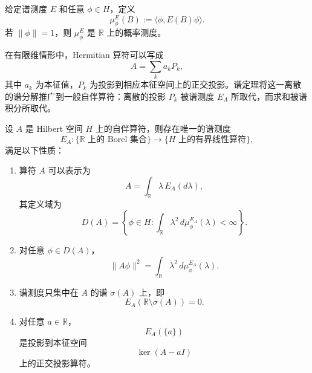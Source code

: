 \documentclass[UTF8,a4paper,11pt,openany]{ctexbook}
\begin{document}
给定谱测度 $E$ 和任意 $\phi\in H$，定义
\begin{equation}
    \mu_\phi^E(B)
    :=
    \langle \phi,E(B)\phi\rangle .
\end{equation}
若 $\|\phi\|=1$，则 $\mu_\phi^E$ 是 $\mathbb R$ 上的概率测度。

在有限维情形中，Hermitian 算符可以写成
\[
A=\sum_k a_kP_k,
\]
其中 $a_k$ 为本征值，$P_k$ 为投影到相应本征空间上的正交投影。谱定理将这一离散的谱分解推广到一般自伴算符：离散的投影 $P_k$ 被谱测度 $E_A$ 所取代，而求和被谱积分所取代。

\begin{proposition}[谱定理]
设 $A$ 是 Hilbert 空间 $H$ 上的自伴算符，则存在唯一的谱测度
\[
E_A:
\{\mathbb R\text{ 上的 Borel 集合}\}
\longrightarrow
\{H\text{ 上的有界线性算符}\},
\]
满足以下性质：

\begin{enumerate}
    \item 算符 $A$ 可以表示为
    \begin{equation}
        A
        =
        \int_{\mathbb R}
        \lambda\,E_A(d\lambda),
    \end{equation}
    其定义域为
    \begin{equation}
        D(A)
        =
        \left\{
        \phi\in H:
        \int_{\mathbb R}
        \lambda^2\,d\mu_\phi^{E_A}(\lambda)
        <\infty
        \right\}.
    \end{equation}

    \item 对任意 $\phi\in D(A)$，
    \begin{equation}
        \|A\phi\|^2
        =
        \int_{\mathbb R}
        \lambda^2\,d\mu_\phi^{E_A}(\lambda).
    \end{equation}

    \item 谱测度只集中在 $A$ 的谱 $\sigma(A)$ 上，即
    \begin{equation}
        E_A\!\left(
        \mathbb R\setminus\sigma(A)
        \right)
        =
        0.
    \end{equation}

    \item 对任意 $a\in\mathbb R$，
    \begin{equation}
        E_A(\{a\})
    \end{equation}
    是投影到本征空间
    \begin{equation}
        \ker(A-aI)
    \end{equation}
    上的正交投影算符。
\end{enumerate}
\end{proposition}
\end{document}
